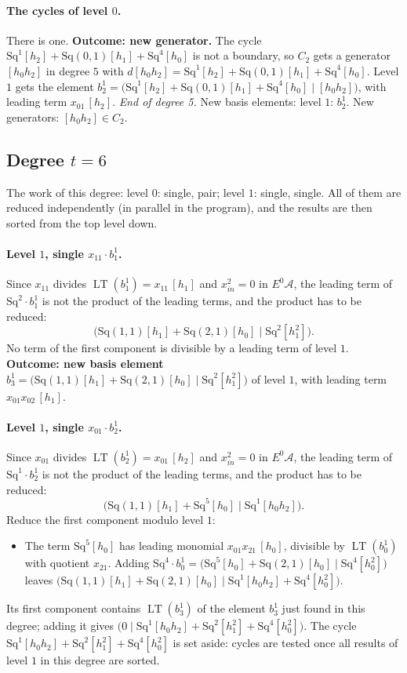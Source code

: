 \documentclass[11pt]{article}
\newcommand{\Sq}{\mathrm{Sq}}
\DeclareMathOperator{\LT}{LT}
\begin{document}
\paragraph{The cycles of level $0$.} There is one.
\textbf{Outcome: new generator.} The cycle $\Sq^{1}[h_2] + \Sq(0,1)[h_1] + \Sq^{4}[h_0]$ is not a boundary, so $C_{2}$ gets a generator $[h_0h_2]$ in degree $5$ with $d[h_0h_2] = \Sq^{1}[h_2] + \Sq(0,1)[h_1] + \Sq^{4}[h_0]$.
Level $1$ gets the element $b^{1}_{2} = \bigl(\Sq^{1}[h_2] + \Sq(0,1)[h_1] + \Sq^{4}[h_0] \;\big|\; [h_0h_2]\bigr)$, with leading term $x_{01}\,[h_2]$.
\medskip\noindent\emph{End of degree 5.} New basis elements: level $1$: $b^{1}_{2}$. New generators: $[h_0h_2]\in C_{2}$.
\subsection*{Degree $t = 6$}
\noindent The work of this degree: level $0$: single, pair; level $1$: single, single. All of them are reduced independently (in parallel in the program), and the results are then sorted from the top level down.
\medskip
\paragraph{Level $1$, single $x_{11}\cdot b^{1}_{1}$.} Since $x_{11}$ divides $\LT(b^{1}_{1}) = x_{11}\,[h_1]$ and $x_{in}^2 = 0$ in $E^0\mathcal A$, the leading term of $\Sq^{2}\cdot b^{1}_{1}$ is not the product of the leading terms, and the product has to be reduced:
\[\bigl(\Sq(1,1)[h_1] + \Sq(2,1)[h_0] \;\big|\; \Sq^{2}[h_1^2]\bigr).\]
No term of the first component is divisible by a leading term of level $1$.
\textbf{Outcome: new basis element} $b^{1}_{3} = \bigl(\Sq(1,1)[h_1] + \Sq(2,1)[h_0] \;\big|\; \Sq^{2}[h_1^2]\bigr)$ of level $1$, with leading term $x_{01}x_{02}\,[h_1]$.
\medskip
\paragraph{Level $1$, single $x_{01}\cdot b^{1}_{2}$.} Since $x_{01}$ divides $\LT(b^{1}_{2}) = x_{01}\,[h_2]$ and $x_{in}^2 = 0$ in $E^0\mathcal A$, the leading term of $\Sq^{1}\cdot b^{1}_{2}$ is not the product of the leading terms, and the product has to be reduced:
\[\bigl(\Sq(1,1)[h_1] + \Sq^{5}[h_0] \;\big|\; \Sq^{1}[h_0h_2]\bigr).\]
Reduce the first component modulo level $1$:
\begin{itemize}
\item The term $\Sq^{5}[h_0]$ has leading monomial $x_{01}x_{21}\,[h_0]$, divisible by $\LT(b^{1}_{0})$ with quotient $x_{21}$. Adding $\Sq^{4}\cdot b^{1}_{0} = \bigl(\Sq^{5}[h_0] + \Sq(2,1)[h_0] \;\big|\; \Sq^{4}[h_0^2]\bigr)$ leaves $\bigl(\Sq(1,1)[h_1] + \Sq(2,1)[h_0] \;\big|\; \Sq^{1}[h_0h_2] + \Sq^{4}[h_0^2]\bigr)$.
\end{itemize}
Its first component contains $\LT(b^{1}_{3})$ of the element $b^{1}_{3}$ just found in this degree; adding it gives $\bigl(0 \;\big|\; \Sq^{1}[h_0h_2] + \Sq^{2}[h_1^2] + \Sq^{4}[h_0^2]\bigr)$.
The cycle $\Sq^{1}[h_0h_2] + \Sq^{2}[h_1^2] + \Sq^{4}[h_0^2]$ is set aside: cycles are tested once all results of level $1$ in this degree are sorted.
\medskip
\end{document}
